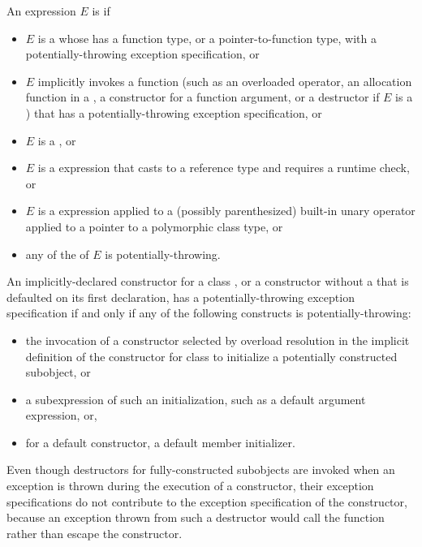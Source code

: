 \pnum
An expression $E$ is
 if
\begin{itemize}
\item
$E$ is a 
whose 
has a function type,
or a pointer-to-function type,
with a potentially-throwing exception specification,
or
\item
$E$ implicitly invokes a function
(such as an overloaded operator,
an allocation function in a ,
a constructor for a function argument,
or a destructor if $E$ is a )
that has a potentially-throwing exception specification,
or
\item
$E$ is a ,
or
\item
$E$ is a  expression that casts to a reference type and
requires a runtime check,
or
\item
$E$ is a  expression applied to a
(possibly parenthesized) built-in unary \tcode{*} operator
applied to a pointer to a
polymorphic class type,
or
\item
any of the 
of $E$ is potentially-throwing.
\end{itemize}

\pnum
An implicitly-declared constructor for a class ,
or a constructor without a 
that is defaulted on its first declaration,
has a potentially-throwing exception specification
if and only if
any of the following constructs is potentially-throwing:
\begin{itemize}
\item
the invocation of a constructor selected by overload resolution
in the implicit definition of the constructor
for class 
to initialize a potentially constructed subobject, or
\item
a subexpression of such an initialization,
such as a default argument expression, or,
\item
for a default constructor, a default member initializer.
\end{itemize}
\begin{note}
Even though destructors for fully-constructed subobjects
are invoked when an exception is thrown
during the execution of a constructor,
their exception specifications do not contribute
to the exception specification of the constructor,
because an exception thrown from such a destructor
would call the function 
rather than escape the constructor.
\end{note}

